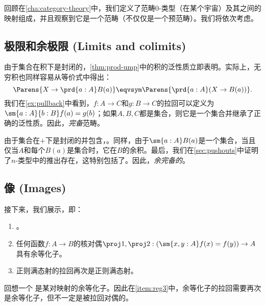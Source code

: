 回顾在\cref{cha:category-theory}中，我们定义了范畴$0$-类型（在某个宇宙）及其之间的映射组成，并且观察到它是一个范畴（不仅仅是一个预范畴）。我们将依次考虑。

\subsection{极限和余极限 (Limits and colimits)}
\label{subsec:limits-sets}

%
%

由于集合在积下是封闭的，\cref{thm:prod-ump}中的积的泛性质立即表明。实际上，无穷积也同样容易从等价式中得出：
\[ \Parens{X\to \prd{a:A} B(a)} \eqvsym \Parens{\prd{a:A} (X\to B(a))}.\]
我们在\cref{ex:pullback}中看到，$f:A\to C$和$g:B\to C$的拉回可以定义为$\sm{a:A}{b:B} f(a)=g(b)$；如果$A,B,C$都是集合，则它是一个集合并继承了正确的泛性质。因此，\emph{完备}范畴。
%
%

由于集合在$+$下是封闭的并包含\emptyt，。同样，由于$\sm{a:A}B(a)$是一个集合，当且仅当$A$和每个$B(a)$是集合时，它在$B$的余积。最后，我们在\cref{sec:pushouts}中证明了$n$-类型中的推出存在，这特别包括了\uset。因此，\emph{余完备的}。
%
%

\subsection{像 (Images)}
\label{sec:image}

接下来，我们展示，即：
%
%
%
\begin{enumerate}
  \item {}。\label{item:reg1}
  \item 任何函数$f : A \to B$的核对偶$\proj1,\proj2: (\sm{x,y:A} f(x)= f(y)) \to A$具有余等化子。\label{item:reg2}
  \item 正则满态射的拉回再次是正则满态射。\label{item:reg3}
\end{enumerate}
%
回想一个
%
%
是某对映射的余等化子。因此在\ref{item:reg3}中，余等化子的拉回需要再次是余等化子，但不一定是被拉回对偶的。


